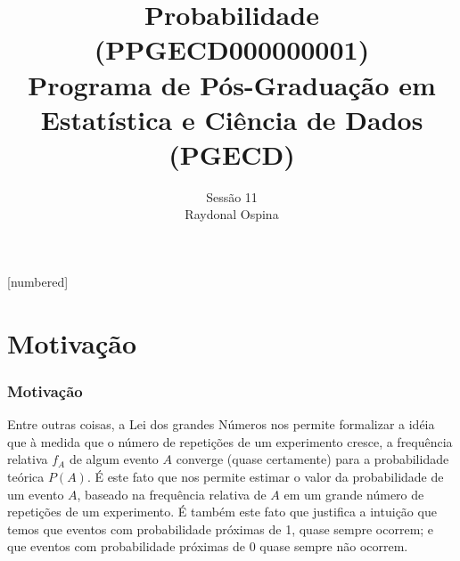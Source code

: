 


[numbered]



\hypersetup{colorlinks,linkcolor=,urlcolor=links}


\graphicspath{{./graphics/}} 			%

\newcommand{\cor}[1]{ \{{#1}\}}

\title[Probabilidade]{  Probabilidade (PPGECD000000001) \\ \vspace{1cm}Programa de Pós-Graduação em Estatística e Ciência de Dados (PGECD) }
\author[ Raydonal Ospina 
\ ]{
	Sessão 11 \\
	${}$ \\
	Raydonal Ospina  }

\date[]{}






\begin{frame}
  \titlepage
\end{frame}


\section{Motivação}
\begin{frame}
\frametitle{\textbf{Motivação}}
\baselineskip=13pt
\begin{block}{}
	
	
	Entre outras coisas, a Lei dos grandes Números nos permite
	formalizar a idéia que à medida que o número de repetições de um
	experimento cresce, a frequência relativa $f_A$ de algum evento $A$
	converge (quase certamente) para a probabilidade teórica $P(A)$. É
	este fato que nos permite estimar o valor da probabilidade de um
	evento $A$, baseado na frequência relativa de $A$ em um grande
	número de repetições de um experimento. É também este fato que justifica a intuição que temos que eventos com probabilidade próximas de 1, quase sempre ocorrem; e que eventos com probabilidade próximas de 0 quase sempre não ocorrem.
\end{block}
\end{frame}



